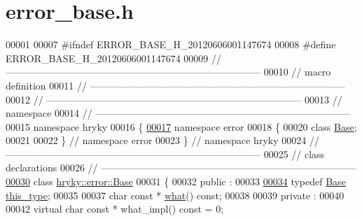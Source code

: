 \hypertarget{error__base_8h_source}{\section{error\-\_\-base.\-h}
}

\begin{DoxyCode}
00001 
00007 \textcolor{preprocessor}{#ifndef ERROR\_BASE\_H\_20120606001147674}
00008 \textcolor{preprocessor}{}\textcolor{preprocessor}{#define ERROR\_BASE\_H\_20120606001147674}
00009 \textcolor{preprocessor}{}\textcolor{comment}{//
      ------------------------------------------------------------------------------}
00010 \textcolor{comment}{// macro definition}
00011 \textcolor{comment}{//
      ------------------------------------------------------------------------------}
00012 \textcolor{comment}{//
      ------------------------------------------------------------------------------}
00013 \textcolor{comment}{// namespace}
00014 \textcolor{comment}{//
      ------------------------------------------------------------------------------}
00015 \textcolor{keyword}{namespace }hryky
00016 \{
\hypertarget{error__base_8h_source_l00017}{}\hyperlink{namespacehryky_1_1error}{00017} \textcolor{keyword}{namespace }error
00018 \{
00020     \textcolor{keyword}{class }\hyperlink{classhryky_1_1error_1_1_base}{Base};
00021 
00022 \} \textcolor{comment}{// namespace error}
00023 \} \textcolor{comment}{// namespace hryky}
00024 \textcolor{comment}{//
      ------------------------------------------------------------------------------}
00025 \textcolor{comment}{// class declarations}
00026 \textcolor{comment}{//
      ------------------------------------------------------------------------------}
\hypertarget{error__base_8h_source_l00030}{}\hyperlink{classhryky_1_1error_1_1_base}{00030} \textcolor{comment}{}\textcolor{keyword}{class }\hyperlink{classhryky_1_1error_1_1_base}{hryky::error::Base}
00031 \{
00032 \textcolor{keyword}{public} :
00033 
\hypertarget{error__base_8h_source_l00034}{}\hyperlink{classhryky_1_1error_1_1_base_a7d07231e2ff50487bae34d684a5b6595}{00034}     \textcolor{keyword}{typedef} \hyperlink{classhryky_1_1error_1_1_base}{Base} \hyperlink{classhryky_1_1error_1_1_base_a7d07231e2ff50487bae34d684a5b6595}{this_type};
00035 
00037     \textcolor{keywordtype}{char} \textcolor{keyword}{const} * \hyperlink{classhryky_1_1error_1_1_base_ada15aa71a7243d03e8229fbcf4e6f295}{what}() \textcolor{keyword}{const};
00038 
00039 \textcolor{keyword}{private} :
00040 
00042     \textcolor{keyword}{virtual} \textcolor{keywordtype}{char} \textcolor{keyword}{const} * what\_impl() \textcolor{keyword}{const} = 0;

\end{DoxyCode}
